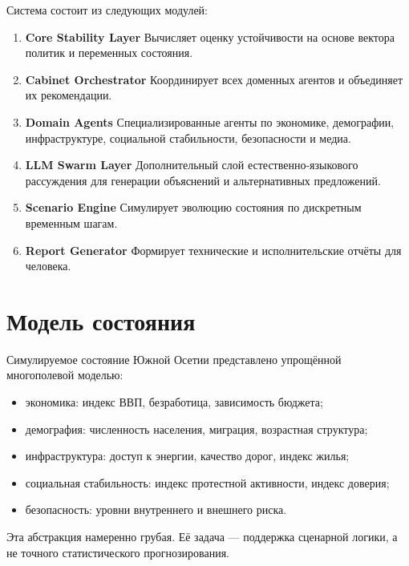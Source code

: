 \documentclass[11pt,a4paper]{article}
\begin{document}
Система состоит из следующих модулей:

\begin{enumerate}[leftmargin=1.5em]
    \item \textbf{Core Stability Layer}  
    Вычисляет оценку устойчивости на основе вектора политик и переменных состояния.

    \item \textbf{Cabinet Orchestrator}  
    Координирует всех доменных агентов и объединяет их рекомендации.

    \item \textbf{Domain Agents}  
    Специализированные агенты по экономике, демографии, инфраструктуре, социальной стабильности, безопасности и медиа.

    \item \textbf{LLM Swarm Layer}  
    Дополнительный слой естественно-языкового рассуждения для генерации объяснений и альтернативных предложений.

    \item \textbf{Scenario Engine}  
    Симулирует эволюцию состояния по дискретным временным шагам.

    \item \textbf{Report Generator}  
    Формирует технические и исполнительские отчёты для человека.
\end{enumerate}

\section{Модель состояния}

Симулируемое состояние Южной Осетии представлено упрощённой многополевой моделью:

\begin{itemize}[leftmargin=1.5em]
    \item экономика: индекс ВВП, безработица, зависимость бюджета;
    \item демография: численность населения, миграция, возрастная структура;
    \item инфраструктура: доступ к энергии, качество дорог, индекс жилья;
    \item социальная стабильность: индекс протестной активности, индекс доверия;
    \item безопасность: уровни внутреннего и внешнего риска.
\end{itemize}

Эта абстракция намеренно грубая. Её задача — поддержка сценарной логики, а не точного статистического прогнозирования.
\end{document}
